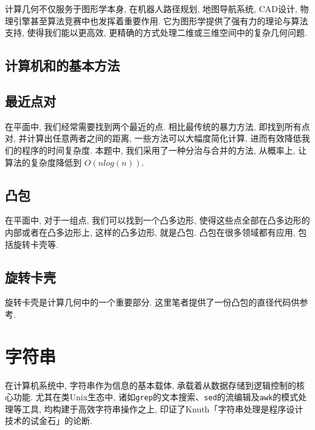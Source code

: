 \documentclass[a4paper]{ctexbook}
\begin{document}
计算几何不仅服务于图形学本身, 在机器人路径规划, 地图导航系统, CAD设计, 物理引擎甚至算法竞赛中也发挥着重要作用. 它为图形学提供了强有力的理论与算法支持, 使得我们能以更高效, 更精确的方式处理二维或三维空间中的复杂几何问题.

\section{计算机和的基本方法}



\section{最近点对}

在平面中, 我们经常需要找到两个最近的点. 相比最传统的暴力方法, 即找到所有点对, 并计算出任意两者之间的距离, 一些方法可以大幅度简化计算, 进而有效降低我们的程序的时间复杂度. 本题中, 我们采用了一种分治与合并的方法, 从概率上, 让算法的复杂度降低到 $O(nlog(n))$.



\section{凸包}
在平面中, 对于一组点, 我们可以找到一个凸多边形, 使得这些点全部在凸多边形的内部或者在凸多边形上, 这样的凸多边形, 就是凸包. 凸包在很多领域都有应用, 包括旋转卡壳等.



\section{旋转卡壳}

旋转卡壳是计算几何中的一个重要部分. 这里笔者提供了一份凸包的直径代码供参考.



\chapter{字符串}

在计算机系统中, 字符串作为信息的基本载体, 承载着从数据存储到逻辑控制的核心功能. 尤其在类Unix生态中, 诸如\texttt{grep}的文本搜索、\texttt{sed}的流编辑及\texttt{awk}的模式处理等工具, 均构建于高效字符串操作之上, 印证了Knuth「字符串处理是程序设计技术的试金石」的论断.
\end{document}
